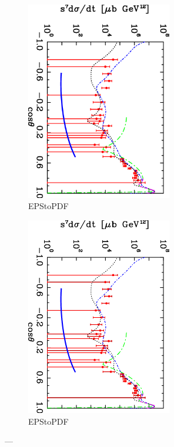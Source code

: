 \documentclass[aps,prc,twocolumn,floatfix,showpacs,preprintnumbers,amsmath,amssymb,superscriptaddress,linenumbers]{revtex4-1}
\begin{document}
\begin{figure}
\centerline{
        \includegraphics[width=2.5in, angle=90]{kroll.eps}}

        \caption {EPStoPDF} \label{fig:kroll}
\end{figure}
\begin{figure}
\centerline{
        \includegraphics[width=2.5in, angle=90]{kroll.png}}

        \caption {EPStoPDF} \label{fig:krollPNG}
\end{figure}

---
\end{document}
